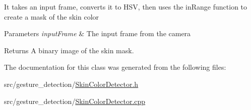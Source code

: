 It takes an input frame, converts it to H\+SV, then uses the in\+Range function to create a mask of the skin color


\begin{DoxyParams}{Parameters}
{\em input\+Frame} & The input frame from the camera\\
\hline
\end{DoxyParams}
\begin{DoxyReturn}{Returns}
A binary image of the skin mask. 
\end{DoxyReturn}


The documentation for this class was generated from the following files\+:\begin{DoxyCompactItemize}
\item 
src/gesture\+\_\+detection/\hyperlink{SkinColorDetector_8h}{Skin\+Color\+Detector.\+h}\item 
src/gesture\+\_\+detection/\hyperlink{SkinColorDetector_8cpp}{Skin\+Color\+Detector.\+cpp}\end{DoxyCompactItemize}
